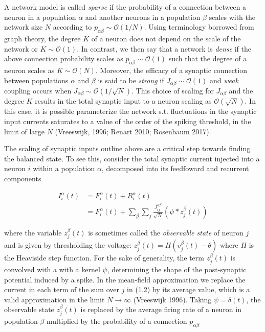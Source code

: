 \documentclass{ucetd}
\begin{document}
A network model is called \emph{sparse} if the probability of a connection between a neuron in a population $\alpha$ and another neurons in a population $\beta$ scales with the network size $N$ according to $p_{\alpha\beta} \sim \mathcal{O}(1/N)$. Using terminology borrowed from graph theory, the degree $K$ of a neuron does not depend on the scale of the network or $K \sim \mathcal{O}(1)$. In contrast, we then say that a network is \emph{dense} if the above connection probability scales as $p_{\alpha\beta} \sim \mathcal{O}(1)$ such that the degree of a neuron scales as $K \sim \mathcal{O}(N)$. Moreover, the efficacy of a synaptic connection between populations $\alpha$ and $\beta$ is said to be \emph{strong} if $J_{\alpha\beta} \sim \mathcal{O}(1)$ and \emph{weak} coupling occurs when $J_{\alpha\beta} \sim \mathcal{O}(1/\sqrt{N})$. This choice of scaling for $J_{\alpha\beta}$ and the degree $K$ results in the total synaptic input to a neuron scaling as $\mathcal{O}(\sqrt{N})$. In this case, it is possible parameterize the network s.t. fluctuations in the synaptic input currents saturates to a value of the order of the spiking threshold, in the limit of large $N$ (Vreeswijk, 1996; Renart 2010; Rosenbaum 2017).  

The scaling of synaptic inputs outline above are a critical step towards finding the balanced state. To see this, consider the total synaptic current injected into a neuron $i$ within a population $\alpha$, decomposed into its feedfoward and recurrent components

\begin{align}
I_{i}^{\alpha}(t) &= F_{i}^{\alpha}(t) + R_{i}^{\alpha}(t)\\
&= F_{i}^{\alpha}(t) + \sum_{\beta}\sum_{j} \frac{J_{ij}^{\alpha\beta}}{\sqrt{N}}(\psi * z^{\beta}_{j}(t))
\end{align}

where the variable $z^{\beta}_{j}(t)$ is sometimes called the \emph{observable state} of neuron $j$ and is given by thresholding the voltage: $z^{\beta}_{j}(t) = H(v^{\beta}_{j}(t) - \theta)$ where $H$ is the Heaviside step function. For the sake of generality, the term $z^{\beta}_{j}(t)$ is convolved with a with a kernel $\psi$, determining the shape of the post-synaptic potential induced by a spike. In the mean-field approximation we replace the current in each term of the sum over $j$ in (1.2) by its average value, which is a valid approximation in the limit $N\rightarrow\infty$ (Vreeswijk 1996). Taking $\psi = \delta(t)$, the observable state $z^{\beta}_{j}(t)$ is replaced by the average firing rate of a neuron in population $\beta$ multiplied by the probability of a connection $p_{\alpha\beta}$
\end{document}
